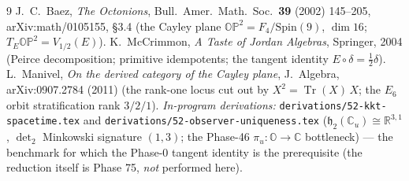 \documentclass[11pt]{article}
\newcommand{\OP}{\mathbb{OP}^2}
\newcommand{\Vhalf}{V_{1/2}}
\newcommand{\Tr}{\operatorname{Tr}}
\newcommand{\jord}{\circ}
\begin{document}
\begin{thebibliography}{9}
 J.~C.~Baez, \emph{The Octonions}, Bull.\ Amer.\ Math.\ Soc.\
\textbf{39} (2002) 145--205, arXiv:math/0105155, \S 3.4 (the Cayley plane
$\OP=F_4/\mathrm{Spin}(9)$, $\dim 16$; $T_E\OP=\Vhalf(E)$).
 K.~McCrimmon, \emph{A Taste of Jordan Algebras}, Springer,
2004 (Peirce decomposition; primitive idempotents; the tangent identity
$E\jord\delta=\tfrac12\delta$).
 L.~Manivel, \emph{On the derived category of the Cayley plane},
J.\ Algebra, arXiv:0907.2784 (2011) (the rank-one locus cut out by
$X^2=\Tr(X)\,X$; the $E_6$ orbit stratification rank $3/2/1$).
 \emph{In-program derivations:} \texttt{derivations/52-kkt-spacetime.tex}
and \texttt{derivations/52-observer-uniqueness.tex}
($\mathfrak{h}_2(\mathbb{C}_u)\cong\mathbb{R}^{3,1}$, $\det_2$ Minkowski signature
$(1,3)$; the Phase-46 $\pi_u\colon\mathbb{O}\to\mathbb{C}$ bottleneck) --- the
benchmark for which the Phase-0 tangent identity is the prerequisite (the
reduction itself is Phase 75, \emph{not} performed here).
\end{thebibliography}
\end{document}
